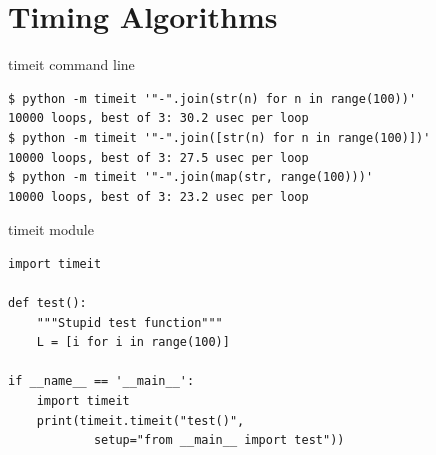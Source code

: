\section{Timing Algorithms}
\begin{frame}[fragile]{timeit command line}
	\begin{verbatim}
$ python -m timeit '"-".join(str(n) for n in range(100))'
10000 loops, best of 3: 30.2 usec per loop
$ python -m timeit '"-".join([str(n) for n in range(100)])'
10000 loops, best of 3: 27.5 usec per loop
$ python -m timeit '"-".join(map(str, range(100)))'
10000 loops, best of 3: 23.2 usec per loop
  \end{verbatim}
\end{frame}

\begin{frame}[fragile]{timeit module}
	\begin{verbatim}
import timeit

def test():
    """Stupid test function"""
    L = [i for i in range(100)]

if __name__ == '__main__':
    import timeit
    print(timeit.timeit("test()",
            setup="from __main__ import test"))
  \end{verbatim}
\end{frame}




